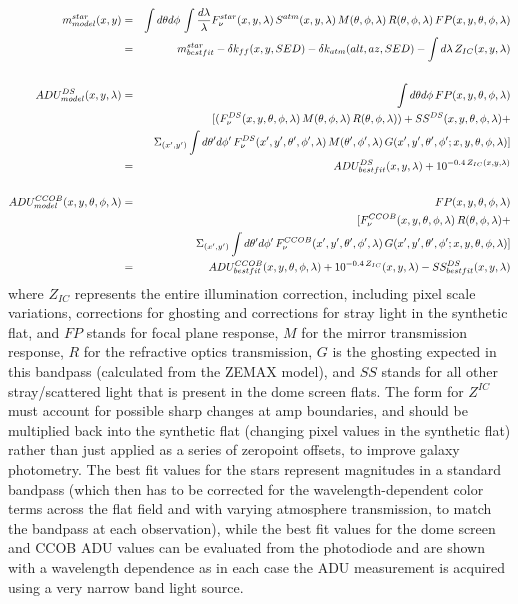 \documentclass[12pt,preprint]{aastex}
\begin{document}
\begin{eqnarray}
m^{star}_{model}(x,y) & = &  \int d\theta d\phi \, \int {d\lambda \over \lambda}
F_\nu^{star}(x,y,\lambda)\,S^{atm}(x,y,\lambda)\,M(\theta,\phi,\lambda)\,R(\theta,\phi,\lambda)\,FP(x,y,\theta,\phi,\lambda)
\nonumber \\
 & = & m^{star}_{bestfit} - \delta k_{ff}(x,y,SED) - \delta
 k_{atm}(alt,az,SED) - \int d\lambda \, Z_{IC}(x,y,\lambda)\\
\nonumber \\
ADU^{DS}_{model}(x,y,\lambda) & = & \int d\theta d\phi \,
FP(x,y,\theta,\phi,\lambda)   \nonumber \\
& & [(F_\nu^{DS}(x,y,\theta,\phi,\lambda)\,M(\theta,\phi,\lambda)\,R(\theta,\phi,\lambda))
+ SS^{DS}(x,y,\theta,\phi,\lambda) +  \nonumber \\ 
& & \Sigma_{(x',y')} \int d\theta' d\phi' \,F_\nu^{DS}(x',y',\theta',
\phi',\lambda)\,M(\theta',\phi',\lambda)\,G(x',y',\theta',\phi';
x,y,\theta,\phi,\lambda)] \nonumber  \\
 & = & ADU^{DS}_{bestfit}(x,y,\lambda) + 10^{-0.4 \,
   Z_{IC}(x,y,\lambda)} \\
\nonumber \\
ADU^{CCOB}_{model}(x,y,\theta,\phi,\lambda) & = &  FP(x,y,\theta,\phi,\lambda) \nonumber \\
& & [ F_\nu^{CCOB}(x,y,\theta,\phi,\lambda)\,R(\theta,\phi,\lambda) +
\nonumber \\
&& \Sigma_{(x',y')} \int d\theta' d\phi'
\,F_\nu^{CCOB}(x',y',\theta',\phi',\lambda)\,G(x',y',\theta',\phi';x,y,\theta,\phi,\lambda)]
\nonumber \\
& = & ADU^{CCOB}_{bestfit}(x,y,\theta,\phi,\lambda) +
10^{-0.4\,Z_{IC}}(x,y,\lambda) - SS^{DS}_{bestfit}(x,y,\lambda) 
\end{eqnarray} 
where $Z_{IC}$ represents the entire illumination correction,
including pixel scale variations, corrections for ghosting and
corrections for stray light in the synthetic flat, and $FP$ stands for
focal plane response, $M$ for the mirror transmission response, $R$ for the
refractive optics transmission, $G$ is the ghosting expected in this bandpass (calculated from
the ZEMAX model), and $SS$ stands for all other stray/scattered light
that is present in the dome screen flats. The form for
$Z^{IC}$ must account for possible sharp changes at amp boundaries,
and should be multiplied back into the synthetic flat (changing pixel
values in the synthetic flat) rather than just applied as a series of
zeropoint offsets, to improve galaxy photometry. The best fit values
for the stars represent magnitudes in a standard bandpass
(which then has to be corrected for the wavelength-dependent color
terms across the flat field and with varying atmosphere transmission,
to match the bandpass at each observation), while the best fit values
for the dome screen and CCOB ADU values can be evaluated from the
photodiode and are shown with a wavelength dependence as in each case
the ADU measurement is acquired using a very narrow band light source.
\end{document}
